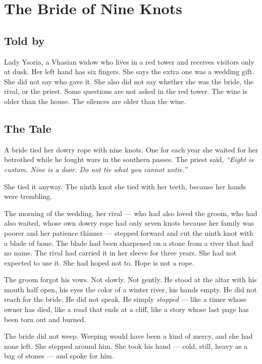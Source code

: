 \chapter{The Bride of Nine Knots}

\section*{Told by}
Lady Ysoria, a Vhasian widow who lives in a red tower and receives visitors only at dusk. Her left hand has six fingers. She says the extra one was a wedding gift. She did not say who gave it. She also did not say whether she was the bride, the rival, or the priest. Some questions are not asked in the red tower. The wine is older than the house. The silences are older than the wine.

\section*{The Tale}

A bride tied her dowry rope with nine knots. One for each year she waited for her betrothed while he fought wars in the southern passes. The priest said, \textit{``Eight is custom. Nine is a door. Do not tie what you cannot untie.''}

She tied it anyway. The ninth knot she tied with her teeth, because her hands were trembling.

The morning of the wedding, her rival --- who had also loved the groom, who had also waited, whose own dowry rope had only seven knots because her family was poorer and her patience thinner --- stepped forward and cut the ninth knot with a blade of bone. The blade had been sharpened on a stone from a river that had no name. The rival had carried it in her sleeve for three years. She had not expected to use it. She had hoped not to. Hope is not a rope.

The groom forgot his vows. Not slowly. Not gently. He stood at the altar with his mouth half open, his eyes the color of a winter river, his hands empty. He did not reach for the bride. He did not speak. He simply \textit{stopped} --- like a timer whose owner has died, like a road that ends at a cliff, like a story whose last page has been torn out and burned.

The bride did not weep. Weeping would have been a kind of mercy, and she had none left. She stepped around him. She took his hand --- cold, still, heavy as a bag of stones --- and spoke for him.

